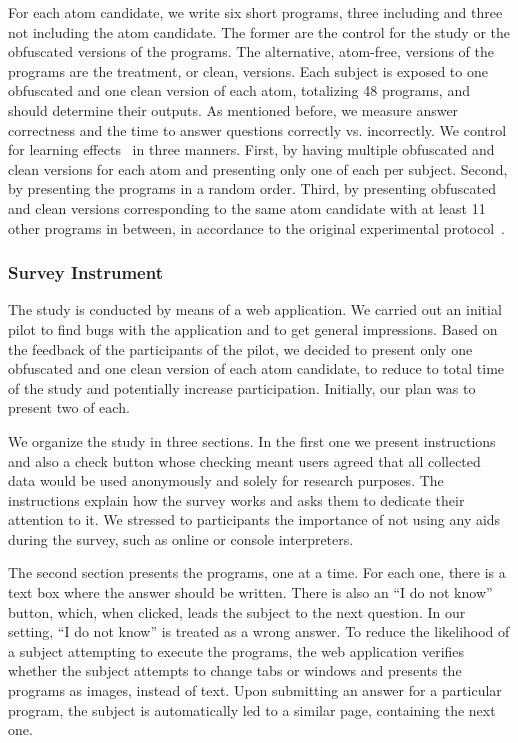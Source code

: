 For each atom candidate, we write six short programs, three including and three not including the atom candidate. The former are the control for the study or the obfuscated versions of the programs. The alternative, atom-free, versions of the programs are the treatment, or clean, versions. Each subject is exposed to one obfuscated and one clean version of each atom, totalizing 48 programs, and should determine their outputs. As mentioned before, we measure answer correctness and the time to answer questions correctly vs. incorrectly. We control for learning effects~\cite{Neely:1991:SPE} in three manners. First, by having multiple obfuscated and clean versions for each atom and presenting only one of each per subject. Second, by presenting the programs in a random order. Third, by presenting obfuscated and clean versions corresponding to the same atom candidate with at least 11 other programs in between, in  accordance to the original experimental protocol~\cite{GopsteinIYDZYC17}. 

\subsubsection*{Survey Instrument} 

The study is conducted by means of a web application. We carried out an initial pilot to find bugs with the application and to get general impressions. Based on the feedback of the participants of the pilot, we decided to present only one obfuscated and one clean version of each atom candidate, to reduce to total time of the study and potentially increase participation. Initially, our plan was to present two of each. 

We organize the study in three sections. In the first one we present instructions and also a check button whose checking meant users agreed that all collected data would be used anonymously and solely for research purposes. The instructions explain how the survey works and asks them to dedicate their attention to it.  We stressed to participants the importance of not using any aids during the survey, such as online or console interpreters. 

The second section presents the programs, one at a time. For each one, there is a text box where the answer should be written. There is also an ``I do not know'' button, which, when clicked, leads the subject to the next question. In our setting, ``I do not know'' is treated as a wrong answer. To reduce the likelihood of a subject attempting to execute the programs, the web application verifies whether the subject attempts to change tabs or windows and presents the programs as images, instead of text. Upon submitting an answer for a particular program, the subject is automatically led to a similar page, containing the next one.

